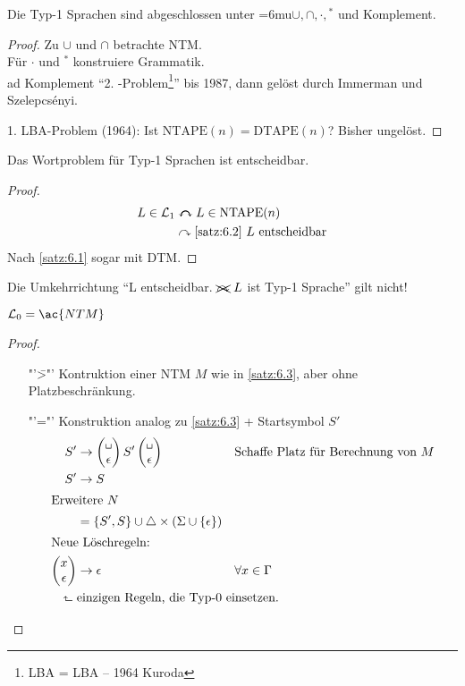 \begin{Satz}
	Die Typ-1 Sprachen sind abgeschlossen unter {\thinmuskip=6mu$\cup,\cap,\cdot,{}^*$} und Komplement.
\end{Satz}
\begin{proof}
	Zu $\cup$ und $\cap$ betrachte \ac{NTM}.\\
	Für $\cdot$ und $^*$ konstruiere Grammatik.\\
	ad Komplement "`2. -Problem\footnote{\acs*{LBA} = \acl*{LBA} -- 1964 Kuroda}"' bis 1987, dann gelöst durch Immerman und Szelepcsényi.
	
	1. \ac{LBA}-Problem (1964): Ist $\mathrm{NTAPE}(n) = \mathrm{DTAPE}(n)$? Bisher ungelöst.
\end{proof}
\begin{Satz}
	Das Wortproblem für Typ-1 Sprachen ist entscheidbar.
\end{Satz}
\begin{proof}
	\begin{align*}
		L\in\mathcal{L}_1 &\curvearrowleftright L\in\mathrm{NTAPE}(n)\\
		&\curvearrowright \text{\autoref{satz:6.2} $L$ entscheidbar}
	\end{align*}
	Nach \autoref{satz:6.1} sogar mit \ac{DTM}.
\end{proof}
Die Umkehrrichtung "`L entscheidbar. $\xcancel{\curvearrowright}\ L$ ist Typ-1 Sprache"' gilt nicht!

\begin{Satz}\label{satz:6.6}
	$\mathcal{L}_0 = \ac{NTM}$
\end{Satz}
\begin{proof}
	\begin{itemize}
	\item["'\=>"'] Kontruktion einer \ac{NTM} $M$ wie in \autoref{satz:6.3}, aber ohne Platzbeschränkung.
	\item["'\<="'] Konstruktion analog zu \autoref{satz:6.3} + Startsymbol $S'$
	\begin{align*}
		S' &\-> \pmqty{\blank\\\epsilon} S' \pmqty{\blank\\\epsilon} &&\text{Schaffe Platz für Berechnung von }M\\
		S' &\-> S\\
	\shortintertext{Erweitere $N$}
		&= \{S',S\}\cup\triangle\x(\Sigma\cup\{\epsilon\})\\
	\shortintertext{Neue Löschregeln:}
		\pmqty{x\\\epsilon} &\-> \epsilon &&\forall x\in\Gamma\\
		\rotatebox{90}{$\Rsh$}\ &\mathrlap{\text{einzigen Regeln, die Typ-0 einsetzen.}} \tag*{\qedhere}
	\end{align*}
	\end{itemize}
\end{proof}

